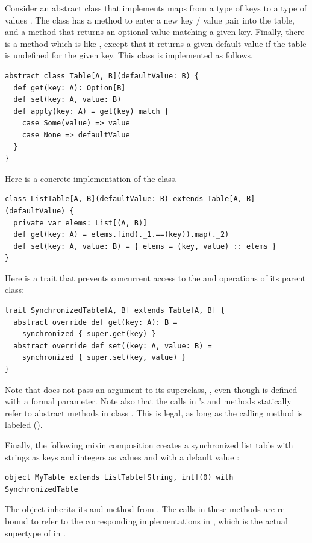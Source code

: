 \example Consider an abstract class  that implements maps
from a type of keys  to a type of values . The class
has a method  to enter a new key / value pair into the table,
and a method  that returns an optional value matching a
given key. Finally, there is a method  which is like
, except that it returns a given default value if the table
is undefined for the given key. This class is implemented as follows.
\begin{lstlisting}
abstract class Table[A, B](defaultValue: B) {
  def get(key: A): Option[B]
  def set(key: A, value: B)
  def apply(key: A) = get(key) match {
    case Some(value) => value
    case None => defaultValue
  }
}
\end{lstlisting}
Here is a concrete implementation of the  class.
\begin{lstlisting}
class ListTable[A, B](defaultValue: B) extends Table[A, B](defaultValue) {
  private var elems: List[(A, B)]
  def get(key: A) = elems.find(._1.==(key)).map(._2)
  def set(key: A, value: B) = { elems = (key, value) :: elems }
}
\end{lstlisting}
Here is a trait that prevents concurrent access to the
 and  operations of its parent class:
\begin{lstlisting}
trait SynchronizedTable[A, B] extends Table[A, B] {
  abstract override def get(key: A): B = 
    synchronized { super.get(key) }
  abstract override def set((key: A, value: B) = 
    synchronized { super.set(key, value) }
}

\end{lstlisting}
Note that  does not pass an argument to
its superclass, , even  though  is defined with a
formal parameter. Note also that the  calls
in 's  and  methods
statically refer to abstract methods in class . This is
legal, as long as the calling method is labeled 
 ().

Finally, the following mixin composition creates a synchronized list table
with strings as keys and integers as values and with a default value :
\begin{lstlisting}
object MyTable extends ListTable[String, int](0) with SynchronizedTable
\end{lstlisting}
The object  inherits its  and 
method from .  The  calls in these
methods are re-bound to refer to the corresponding implementations in
, which is the actual supertype of  
in . 

